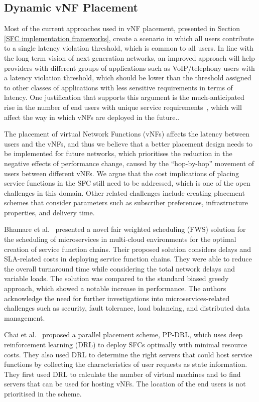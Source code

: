 \documentclass[futureinternet,review,accept,pdftex,moreauthors]{Definitions/mdpi}
\begin{document}
\subsection{Dynamic vNF Placement}
\label{vNF placement}
Most of the current approaches used in vNF placement, presented in Section \ref{SFC implementation frameworks}, create a scenario in which all users contribute to a single latency violation threshold, which is common to all users. In line with the long term vision of next generation networks, an improved approach will help providers with different groups of applications such as VoIP/telephony users with a latency violation threshold, which should be lower than the threshold assigned to other classes of applications with less sensitive requirements in terms of latency. One justification that supports this argument is the much-anticipated rise in the number of end users with unique service requirements~\cite{wang2021availability}, which will affect the way in which vNFs are deployed in the future.. 

The placement of virtual Network Functions (vNFs) affects the latency between users and the vNFs, and thus we believe that a better placement design needs to be implemented for future networks, which prioritises the reduction in the negative effects of performance change, caused by the “hop-by-hop” movement of users between different vNFs. We argue that the cost implications of placing service functions in the SFC still need to be addressed, which is one of the open challenges in this domain. Other related challenges include creating placement schemes that  consider parameters such as subscriber preferences, infrastructure properties, and delivery time. 

Bhamare {et al.}~\cite{bhamare2018exploring} presented a novel fair weighted scheduling (FWS) solution for the scheduling of microservices in multi-cloud environments for the optimal creation of service function chains. Their proposed solution considers delays and SLA-related costs in deploying service function chains. They were able to reduce the overall turnaround time while considering the total network delays and variable loads. The solution was compared to the standard biased greedy approach, which showed a notable increase in performance. The authors acknowledge the need for further investigations into microservices-related challenges such as security, fault tolerance, load balancing, and distributed data management.

Chai {et al.}~\cite{chai2019parallel} proposed a parallel placement scheme, PP-DRL, which uses deep reinforcement learning (DRL) to deploy SFCs optimally with minimal resource costs. They also  used DRL to determine the right servers that could host service functions by collecting the characteristics of user requests as state information. They first used DRL to calculate the number of virtual machines and to find servers that can be used for hosting vNFs. The location of the end users is not prioritised in the scheme.
\end{document}
